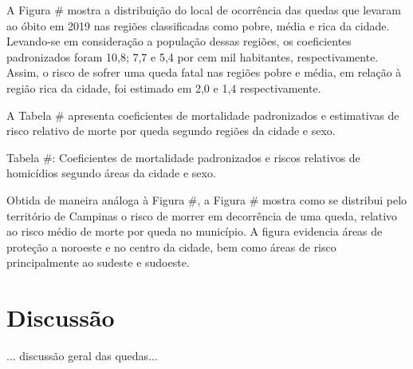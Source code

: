 A Figura \# mostra a distribuição do local de ocorrência das quedas que levaram ao óbito em 2019 nas regiões classificadas como pobre, média e rica da cidade. Levando-se em consideração a população dessas regiões, os coeficientes padronizados foram 10,8; 7,7 e 5,4 por cem mil habitantes, respectivamente. Assim, o risco de sofrer uma queda fatal nas regiões pobre e média, em relação à região rica da cidade, foi estimado em 2,0 e 1,4 respectivamente.

A Tabela \# apresenta coeficientes de mortalidade padronizados e estimativas de risco relativo de morte por queda segundo regiões da cidade e sexo.

Tabela \#: Coeficientes de mortalidade padronizados e riscos relativos de homicídios segundo áreas da cidade e sexo.

Obtida de maneira análoga à Figura \#, a Figura \# mostra como se distribui pelo território de Campinas o risco de morrer em decorrência de uma queda, relativo ao risco médio de morte por queda no município. A figura evidencia áreas de proteção a noroeste e no centro da cidade, bem como áreas de risco principalmente ao sudeste e sudoeste.

\section{Discussão}

... discussão geral das quedas...
